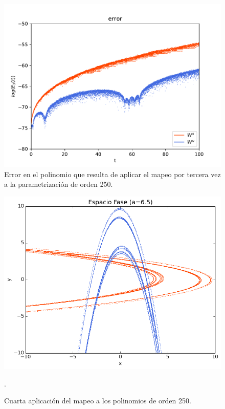 \begin{figure}[H]
\centering
\includegraphics[scale=0.6]{error3ite}
\caption{Error en el polinomio que resulta de aplicar el mapeo por tercera vez a la parametrización de orden 250.}
\label{error-3iteracion}
\end{figure}

\begin{figure}[H]
\centering
\includegraphics[scale=0.6]{rectangulo4A}
\caption{Cuarta aplicación del mapeo a los polinomios de orden 250.}.
\label{Rectangulo4}
\end{figure}

